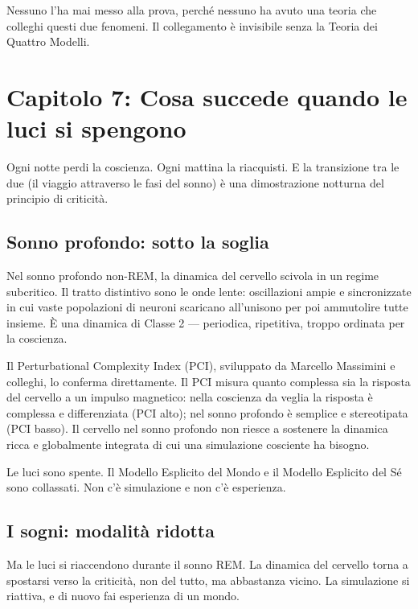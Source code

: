 \documentclass[11pt, twoside, openright]{book}
\begin{document}
Nessuno l'ha mai messo alla prova, perché nessuno ha avuto una teoria che colleghi questi due fenomeni. Il collegamento è invisibile senza la Teoria dei Quattro Modelli.


\chapter*{Capitolo 7: Cosa succede quando le luci si spengono}

Ogni notte perdi la coscienza. Ogni mattina la riacquisti. E la transizione tra le due (il viaggio attraverso le fasi del sonno) è una dimostrazione notturna del principio di criticità.

\section*{Sonno profondo: sotto la soglia}

Nel sonno profondo non-REM, la dinamica del cervello scivola in un regime subcritico. Il tratto distintivo sono le onde lente: oscillazioni ampie e sincronizzate in cui vaste popolazioni di neuroni scaricano all'unisono per poi ammutolire tutte insieme. È una dinamica di Classe 2 --- periodica, ripetitiva, troppo ordinata per la coscienza.

Il Perturbational Complexity Index (PCI), sviluppato da Marcello Massimini e colleghi, lo conferma direttamente. Il PCI misura quanto complessa sia la risposta del cervello a un impulso magnetico: nella coscienza da veglia la risposta è complessa e differenziata (PCI alto); nel sonno profondo è semplice e stereotipata (PCI basso). Il cervello nel sonno profondo non riesce a sostenere la dinamica ricca e globalmente integrata di cui una simulazione cosciente ha bisogno.

Le luci sono spente. Il Modello Esplicito del Mondo e il Modello Esplicito del Sé sono collassati. Non c'è simulazione e non c'è esperienza.

\section*{I sogni: modalità ridotta}

Ma le luci si riaccendono durante il sonno REM. La dinamica del cervello torna a spostarsi verso la criticità, non del tutto, ma abbastanza vicino. La simulazione si riattiva, e di nuovo fai esperienza di un mondo.
\end{document}

